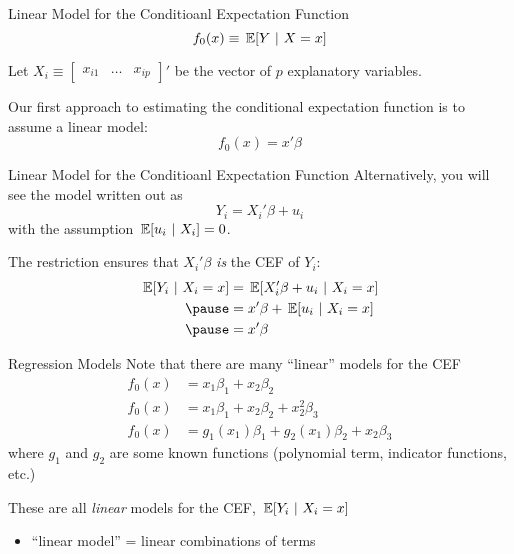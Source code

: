 \documentclass[aspectratio=169,t,11pt,table]{beamer}
\begin{document}
\begin{frame}{Linear Model for the Conditioanl Expectation Function}
  \vspace*{-\bigskipamount}
  $$
    f_0(x) \equiv \expec{Y}{X = x}
  $$
  
  Let $X_i \equiv \begin{bmatrix}x_{i1} & \dots & x_{ip}\end{bmatrix}'$ be the vector of $p$ explanatory variables. 

  \bigskip
  Our first approach to estimating the conditional expectation function is to assume a linear model:
  $$
    f_0(x) = x' \beta
  $$
\end{frame}

\begin{frame}{Linear Model for the Conditioanl Expectation Function}
  Alternatively, you will see the model written out as
  $$
    Y_i = X_i' \beta + u_i
  $$
  with the assumption $\expec{u_i}{X_i} = 0$. 

  \bigskip
  The restriction ensures that $X_i' \beta$ \emph{is} the CEF of $Y_i$:
  \begin{align*}
    \expec{Y_i}{X_i = x} &= 
    \expec{X_i' \beta + u_i}{X_i = x} \\ \pause
    &= x' \beta +  \expec{u_i}{X_i = x} \\ \pause
    &= x' \beta
  \end{align*}
\end{frame}

\begin{frame}{Regression Models}
  Note that there are many ``linear'' models for the CEF
  \begin{align*}
    f_0(x) &= x_1 \beta_1 + x_2 \beta_2 \\ 
    f_0(x) &= x_1 \beta_1 + x_2 \beta_2 + x_2^2 \beta_3 \\ 
    f_0(x) &= g_1(x_1) \beta_1 + g_2(x_1) \beta_2 + x_2 \beta_3 
  \end{align*}
  where $g_1$ and $g_2$ are some known functions (polynomial term, indicator functions, etc.)

  \bigskip
  These are all \emph{linear} models for the CEF, $\expec{Y_i}{X_i = x}$
  \begin{itemize}
    \item ``linear model'' = linear combinations of terms
  \end{itemize}
\end{frame}
\end{document}
